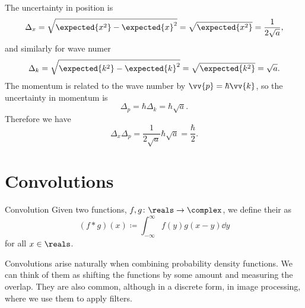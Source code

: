 \documentclass[fleqn]{NotesClass}
\begin{document}
    The uncertainty in position is
    \begin{equation}
        \Delta_x = \sqrt{\expected{x^2} - \expected{x}^2} = \sqrt{\expected{x^2}} = \frac{1}{2\sqrt{a}},
    \end{equation}
    and similarly for wave numer
    \begin{equation}
        \Delta_k = \sqrt{\expected{k^2} - \expected{k}^2} = \sqrt{\expected{k^2}} = \sqrt{a}.
    \end{equation}
    The momentum is related to the wave number by \(\vv{p} = \hbar\vv{k}\), so the uncertainty in momentum is
    \begin{equation}
        \Delta_p = \hbar\Delta_k = \hbar\sqrt{a}.
    \end{equation}
    Therefore we have
    \begin{equation}
        \Delta_x\Delta_p = \frac{1}{2\sqrt{a}} \hbar \sqrt{a} = \frac{\hbar}{2}.
    \end{equation}
    
    \section{Convolutions}
    \begin{dfn}{Convolution}{}
        Given two functions, \(f, g \colon \reals \to \complex\), we define their  as
        \begin{equation}
            (f \ast g)(x) \coloneqq \int_{-\infty}^{\infty} f(y)g(x - y) \dd{y}
        \end{equation}
        for all \(x \in \reals\).
    \end{dfn}
    
    Convolutions arise naturally when combining probability density functions.
    We can think of them as shifting the functions by some amount and measuring the overlap.
    They are also common, although in a discrete form, in image processing, where we use them to apply filters.
    
\end{document}
